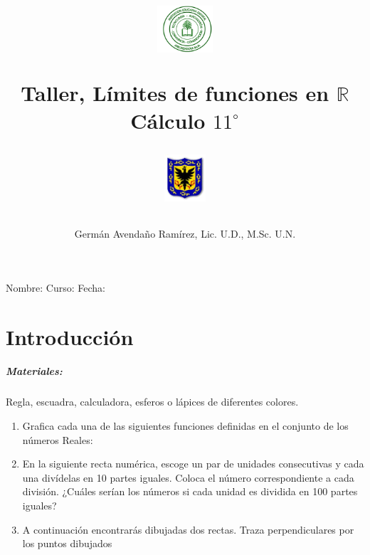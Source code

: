\documentclass[10pt,twoside]{article}
\author{Germ\'an Avenda\~no Ram\'irez, Lic. U.D., M.Sc. U.N.}
\title{\begin{minipage}{.2\textwidth}
\includegraphics[height=1.75cm]{Images/logo-colegio.png}\end{minipage}
\begin{minipage}{.55\textwidth}
\begin{center}
Taller, Límites de funciones en $\mathbb{R}$\\
Cálculo $11^{\circ}$
\end{center}
\end{minipage}\hfill
\begin{minipage}{.2\textwidth}
\includegraphics[height=1.75cm]{Images/logo-sed.png} 
\end{minipage}}
\date{}
\begin{document}
\maketitle
Nombre: \hrulefill Curso: \underline{\hspace*{44pt}} Fecha: \underline{\hspace*{2.5cm}}
\section*{Introducci\'{o}n}
\subparagraph*{Materiales:}
Regla, escuadra, calculadora, esferos o lápices de diferentes colores.
\begin{enumerate}
\item Grafica cada una de las siguientes funciones definidas en el conjunto de los números Reales:
\begin{enumerate}
\end{enumerate}
\item En la siguiente recta numérica, escoge un par de unidades consecutivas y cada una divídelas en 10 partes
iguales. Coloca el número correspondiente a cada división. ¿Cuáles serían los números si cada unidad es dividida en 100 partes iguales?
\begin{center}
\end{center}
\item A continuación encontrarás dibujadas dos rectas. Traza perpendiculares por los puntos dibujados
\begin{center}
\end{center}
\end{enumerate}
\end{document}
